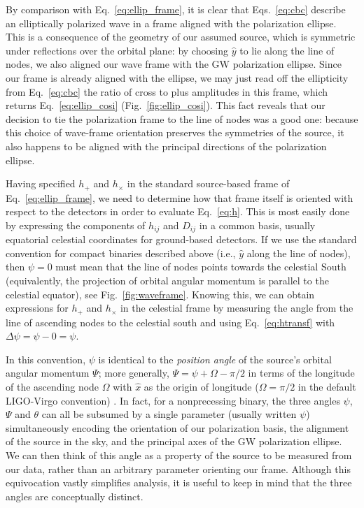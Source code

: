 \documentclass[aps,prd,twocolumn,superscriptaddress,preprintnumbers,floatfix,nofootinbib]{revtex4-2}
\newcommand{\beq}{\begin{equation}}
\newcommand{\eeq}{\end{equation}}
\newcommand*{\eq}[1]{Eq.~\eqref{eq:#1}}
\newcommand*{\red}[1]{#1}
\newcommand*{\red}[1]{{\color{purple} #1}}
\begin{document}
By comparison with Eq.~\eqref{eq:ellip_frame}, it is clear that Eqs.~\eqref{eq:cbc} describe an elliptically polarized wave in a frame aligned with the polarization ellipse.
This is a consequence of the geometry of our assumed source, which is symmetric under reflections over the orbital plane: by choosing $\hat{y}$ to lie along the line of nodes, we also aligned our wave frame with the GW polarization ellipse.
Since our frame is already aligned  with the ellipse, we may just read off the ellipticity from Eq.~\eqref{eq:cbc}
the ratio of cross to plus amplitudes in this frame, which returns \eq{ellip_cosi} (Fig.~\ref{fig:ellip_cosi}).
This fact reveals that our decision to tie the polarization frame to the line of nodes was a good one: because this choice of wave-frame orientation preserves the symmetries of the source, it also happens to be aligned with the principal directions of the polarization ellipse.

Having specified $h_+$ and $h_\times$ in the standard source-based frame of Eq.~\eqref{eq:ellip_frame}, we need to determine how that frame itself is oriented with respect to the detectors in order to evaluate \eq{h}.
This is most easily done by expressing the components of $h_{ij}$ and $D_{ij}$ in a common basis, usually equatorial celestial coordinates for ground-based detectors.
If we use the standard convention for compact binaries described above (i.e., $\hat{y}$ along the line of nodes), then $\psi = 0$ must mean that the line of nodes points towards the celestial South \cite{LALSuite:source} (equivalently, the projection of orbital angular momentum is parallel to the celestial equator), see  Fig.~\ref{fig:waveframe}.
Knowing this, we can obtain expressions for $h_+$ and $h_\times$ in the celestial frame by measuring the angle from the line of ascending nodes to the celestial south and using \eq{htransf} with $\Delta\psi = \psi - 0 =\psi$.

In this convention, $\psi$ is identical to the \emph{position angle} of the source's orbital angular momentum $\Psi$; more generally, $\Psi = \psi \red{+} \Omega \red{-} \pi/2$ in terms of the longitude of the ascending node $\Omega$ with $\hat{x}$ as the origin of longitude ($\Omega = \pi/2$ in the default LIGO-Virgo convention) \cite{LALSuite:source}.
In fact, for a nonprecessing binary, the three angles $\psi$, $\Psi$ and $\theta$ can all be subsumed by a single parameter (usually written $\psi$) simultaneously encoding the orientation of our polarization basis, the alignment of the source in the sky, and the principal axes of the GW polarization ellipse.
We can then think of this angle as a property of the source to be measured from our data, rather than an arbitrary parameter orienting our frame.
Although this equivocation vastly simplifies analysis, it is useful to keep in mind that the three angles are conceptually distinct.
\end{document}
